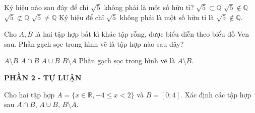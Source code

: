 \begin{ex}%
    Ký hiệu nào sau đây để chỉ $\sqrt{5}$ không phải là một số hữu tỉ?
    \choice
    {$\sqrt{5} \subset \mathbb{Q}$}
    { \True $\sqrt{5} \notin \mathbb{Q}$}
    {$\sqrt{5} \not \subset \mathbb{Q}$}
    {$\sqrt{5} \neq \mathbb{Q}$} 
    \loigiai
    {
     Ký hiệu  để chỉ $\sqrt{5}$ không phải là một số hữu tỉ là $\sqrt{5} \notin \mathbb{Q}$.
    }
\end{ex}
 
\begin{ex}%
    Cho $A, B$ là hai tập hợp bất kì khác tập rỗng, được biểu diễn theo biểu đồ Ven sau. Phần gạch sọc trong hình vẽ là tập hợp nào sau đây?
    \begin{center}
    \end{center}
    \choice
    {\True $A \setminus B$}
    {$A \cap B$}
    {$A \cup B$}
    {$B \setminus A$} 
    \loigiai
    {
        Phần gạch sọc trong hình vẽ là $A \setminus B$.
    }
\end{ex}



\begin{center}
	\textbf{PHẦN 2 - TỰ LUẬN}
\end{center}

\begin{bt}%
	  Cho hai tập hợp $A=\{x \in \mathbb{R},-4 \leq x<2\}$ và $B=[0 ; 4]$. Xác định các tập hợp sau  $A \cap B$, $A \cup B$, $B\setminus  A$.
	\loigiai{
		Ta có $ A=[-4;2) $, do đó 
		\begin{itemize}
			\item $A\cap B=[0;2).$
             \item $A\cup B=[-4;4].$
             \item $B \setminus A=[2;4].$ 
		\end{itemize}
	}
\end{bt}

